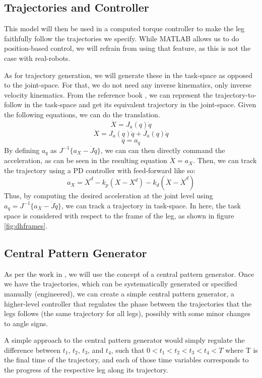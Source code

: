 \documentclass[letterpaper, 10 pt, conference]{ieeeconf}  %
\begin{document}
\subsection{Trajectories and Controller} \label{sec:trajectories}
This model will then be used in a computed torque controller to make the leg faithfully follow the trajectories we specify. While MATLAB allows us to do position-based control, we will refrain from using that feature, as this is not the case with real-robots.

As for trajectory generation, we will generate these in the task-space as opposed to the joint-space. For that, we do not need any inverse kinematics, only inverse velocity kinematics. From the reference book \cite{spong2006robot}, we can represent the trajectory-to-follow in the task-space and get its equivalent trajectory in the joint-space.
Given the following equations, we can do the translation.
$$
\dot{X} = J_a(q)\dot{q} 
$$
$$
\ddot{X} = J_a(q)\ddot{q} + \dot{J_a}(q)\dot{q}
$$
$$
\ddot{q} = a_q
$$
By defining $a_q$ as $J^{-1}\{a_X - \dot{J}\dot{q}\}$, we can can then directly command the acceleration, as can be seen in the resulting equation $\ddot{X} = a_X$. Then, we can track the trajectory using a PD controller with feed-forward like so:
$$
a_X = \ddot{X}^d - k_p (X - X^d) - k_d (\dot{X} - \dot{X}^d)
$$
Thus, by computing the desired acceleration at the joint level using $a_q = J^{-1}\{a_X - \dot{J}\dot{q}\}$, we can track a trajectory in task-space. In here, the task space is considered with respect to the frame of the leg, as shown in figure \ref{fig:dhframes}.

\subsection{Central Pattern Generator}
As per the work in \cite{kimura2007adaptive}, we will use the concept of a central pattern generator. Once we have the trajectories, which can be systematically generated or specified manually (engineered), we can create a simple central pattern generator, a higher-level controller that regulates the phase between the trajectories that the legs follows (the same trajectory for all legs), possibly with some minor changes to angle signs.

A simple approach to the central pattern generator would simply regulate the difference between $t_1$, $t_2$, $t_3$, and $t_4$, such that $0 < t_1 < t_2 < t_3 < t_4 < T$ where T is the final time of the trajectory, and each of those time variables corresponds to the progress of the respective leg along its trajectory.
\end{document}
